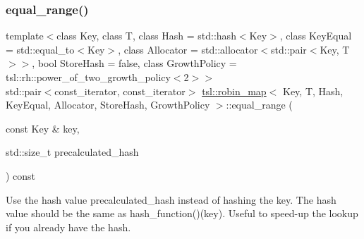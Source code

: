 \subsubsection{\texorpdfstring{equal\_range()}{equal\_range()}\hspace{0.1cm}{\footnotesize\ttfamily [2/6]}}
{\footnotesize\ttfamily template$<$class Key, class T, class Hash = std\+::hash$<$\+Key$>$, class Key\+Equal = std\+::equal\+\_\+to$<$\+Key$>$, class Allocator = std\+::allocator$<$std\+::pair$<$\+Key, T$>$$>$, bool Store\+Hash = false, class Growth\+Policy = tsl\+::rh\+::power\+\_\+of\+\_\+two\+\_\+growth\+\_\+policy$<$2$>$$>$ \\
std\+::pair$<$const\+\_\+iterator, const\+\_\+iterator$>$ \mbox{\hyperlink{classtsl_1_1robin__map}{tsl\+::robin\+\_\+map}}$<$ Key, T, Hash, Key\+Equal, Allocator, Store\+Hash, Growth\+Policy $>$\+::equal\+\_\+range (\begin{DoxyParamCaption}\item[{const Key \&}]{key,  }\item[{std\+::size\+\_\+t}]{precalculated\+\_\+hash }\end{DoxyParamCaption}) const\hspace{0.3cm}{\ttfamily [inline]}}





Use the hash value \textquotesingle{}precalculated\+\_\+hash\textquotesingle{} instead of hashing the key. The hash value should be the same as hash\+\_\+function()(key). Useful to speed-\/up the lookup if you already have the hash. \mbox{\label{classtsl_1_1robin__map_a1b976b054cf9377a097186905ccfcb67}} 

